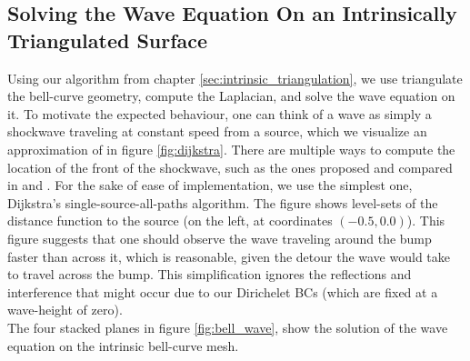\subsection*{Solving the Wave Equation On an Intrinsically Triangulated Surface}
Using our algorithm from chapter \ref{sec:intrinsic_triangulation}, we use triangulate the bell-curve geometry, compute the Laplacian, and solve the wave equation on it. To motivate the expected behaviour, one can think of a wave as simply a shockwave traveling at constant speed from a source, which we visualize an approximation of in figure \ref{fig:dijkstra}. There are multiple ways to compute the location of the front of the shockwave, such as the ones proposed and compared in \cite{vector_dijkstra} and \cite{heat_method}. For the sake of ease of implementation, we use the simplest one, Dijkstra's single-source-all-paths algorithm. The figure shows level-sets of the distance function to the source (on the left, at coordinates $(-0.5, 0.0)$). This figure suggests that one should observe the wave traveling around the bump faster than across it, which is reasonable, given the detour the wave would take to travel across the bump.
This simplification ignores the reflections and interference that might occur due to our Dirichelet BCs (which are fixed at a wave-height of zero).
\\
The four stacked planes in figure \ref{fig:bell_wave}, show the solution of the wave equation on the intrinsic bell-curve mesh.
\label{fig:bell_wave}
\newpage
